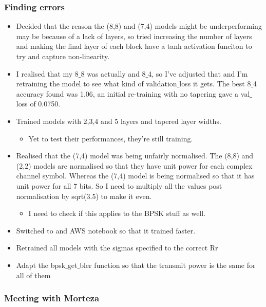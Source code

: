 \documentclass[12pt,onecolumn,letterpaper]{article}
\begin{document}
\subsubsection{Finding errors}

\begin{itemize}
   \item Decided that the reason the (8,8) and (7,4) models might be underperforming may be because of a lack of layers, so tried increasing the number of layers and making the final layer of each block have a tanh activation funciton to try and capture non-linearity.
   \item I realised that my 8$\_$8 was actually and 8$\_$4, so I've adjusted that and I'm retraining the model to see what kind of validation$\_$loss it gets. The best 8$\_$4 accuracy found was 1.06, an initial re-training with no tapering gave a val$\_$loss of 0.0750.
   \item Trained models with 2,3,4 and 5 layers and tapered layer widths.
   \begin{itemize}
      \item Yet to test their performances, they're still training.
   \end{itemize}
   \item Realised that the (7,4) model was being unfairly normalised. The (8,8) and (2,2) models are normalised so that they have unit power for each complex channel symbol. Whereas the (7,4) model is being normalised so that it has unit power for all 7 bits. So I need to multiply all the values post normalisation by sqrt(3.5) to make it even.
   \begin{itemize}
      \item I need to check if this applies to the BPSK stuff as well.
   \end{itemize}
   \item Switched to and AWS notebook so that it trained faster.
   \item Retrained all models with the sigmas specified to the correct Rr
   \item Adapt the bpsk$\_$get$\_$bler function so that the transmit power is the same for all of them
\end{itemize}

\subsubsection{Meeting with Morteza}
\end{document}

